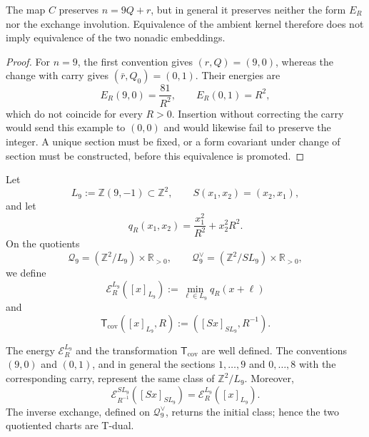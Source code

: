 \begin{proposition}
\label{prop:cierre-vtm-obstruccion-secciones-nonadicas}
The map \(C\) preserves \(n=9Q+r\), but in general it preserves
neither the form \(E_R\) nor the exchange involution. Equivalence of
the ambient kernel therefore does not imply equivalence of the two nonadic
embeddings.
\end{proposition}

\begin{proof}
For \(n=9\), the first convention gives \((r,Q)=(9,0)\), whereas the change with carry gives
\((\bar r,Q_0)=(0,1)\). Their energies are
\[
 E_R(9,0)=\frac{81}{R^2},
 \qquad E_R(0,1)=R^2,
\]
which do not coincide for every \(R>0\). Insertion without correcting
the carry would send this example to \((0,0)\) and would likewise fail to
preserve the integer. A unique section must be fixed, or a form covariant
under change of section must be constructed, before this equivalence is
promoted.
\end{proof}

\begin{definition}
\label{def:cierre-vtm-energia-covariante-seccion}
Let
\[
 L_9:=\mathbb Z(9,-1)\subset\mathbb Z^2,
 \qquad
 S(x_1,x_2)=(x_2,x_1),
\]
and let
\[
 q_R(x_1,x_2)=\frac{x_1^2}{R^2}+x_2^2R^2.
\]
On the quotients
\[
 \mathscr Q_9=(\mathbb Z^2/L_9)\times\mathbb R_{>0},
 \qquad
 \mathscr Q_9^\vee=(\mathbb Z^2/SL_9)\times\mathbb R_{>0},
\]
we define
\[
 \mathcal E_R^{L_9}([x]_{L_9})
 :=\min_{\ell\in L_9}q_R(x+\ell)
\]
and
\[
 \mathsf T_{\mathrm{cov}}([x]_{L_9},R)
 :=([Sx]_{SL_9},R^{-1}).
\]
\end{definition}

\begin{theorem}
\label{thm:cierre-vtm-equivalencia-covariante-secciones}
The energy \(\mathcal E_R^{L_9}\) and the transformation
\(\mathsf T_{\mathrm{cov}}\) are well defined. The conventions
\((9,0)\) and \((0,1)\), and in general the sections \(1,\ldots,9\) and
\(0,\ldots,8\) with the corresponding carry, represent the same class
of \(\mathbb Z^2/L_9\). Moreover,
\[
 \boxed{
 \mathcal E_{R^{-1}}^{SL_9}([Sx]_{SL_9})
 =\mathcal E_R^{L_9}([x]_{L_9}).}
\]
The inverse exchange, defined on \(\mathscr Q_9^\vee\), returns the
initial class; hence the two quotiented charts are T-dual.
\end{theorem}

